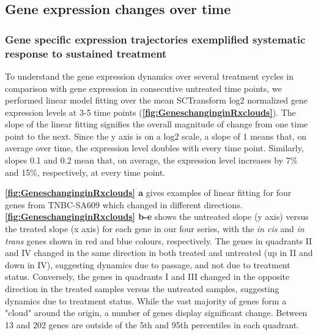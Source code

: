 
\subsection{Gene expression changes over time}

\subsubsection{Gene specific expression trajectories exemplified systematic response to sustained treatment}

To understand the gene expression dynamics over several treatment cycles in comparison with gene expression in consecutive untreated time points, we performed linear model fitting over the mean SCTransform log2 normalized gene expression levels at 3-5 time points (\textbf{\autoref{fig:GeneschanginginRxclouds}}). The slope of the linear fitting signifies the overall magnitude of change from one time point to the next. Since the y axis is on a log2 scale, a slope of 1 means that, on average over time, the expression level doubles with every time point. Similarly, slopes 0.1 and 0.2 mean that, on average, the expression level increases by 7\% and 15\%, respectively, at every time point.

\textbf{\autoref{fig:GeneschanginginRxclouds} a} gives examples of linear fitting for four genes from TNBC-SA609 which changed in different directions. \textbf{\autoref{fig:GeneschanginginRxclouds} b-e} shows the untreated slope (y axis) versus the treated slope (x axis) for each gene in our four series, with the \textit{in cis} and \textit{in trans} genes shown in red and blue colours, respectively. The genes in quadrants II and IV changed in the same direction in both treated and untreated (up in II and down in IV), suggesting dynamics due to passage, and not due to treatment status. Conversely, the genes in quadrants I and III changed in the opposite direction in the treated samples versus the untreated samples, suggesting dynamics due to treatment status. While the vast majority of genes form a "cloud" around the origin, a number of genes display significant change. Between 13 and 202 genes are outside of the 5th and 95th percentiles in each quadrant.



